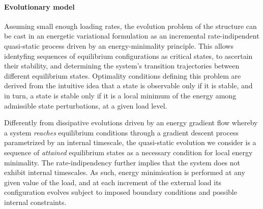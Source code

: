 \paragraph{Evolutionary model}

Assuming small enough loading rates,
the evolution problem of the structure can be cast in an energetic variational formulation as an incremental rate-indipendent quasi-static process driven by an energy-minimality principle.
This allows identyfing sequences of equilibrium configurations as critical states, to ascertain their stability, and determining the system's transition trajectories between different equilibrium states.
Optimality conditions defining this problem are derived from the
intuitive idea that a state is observable only if it is stable, and in turn, a state is stable only if it is a local minimum of the energy among admissible state perturbations, at a given load level.

Differently from dissipative evolutions driven by an energy gradient flow whereby a system \emph{reaches} equilibrium conditions through a gradient descent process parametrized by an internal timescale, the quasi-static evolution we consider is a sequence of \emph{attained} equilibrium states as a necessary condition for local energy minimality.
The rate-indipendency further implies that the system does not exhibit internal timescales.
As such, energy minimisation is performed at any given value of the load, and at each increment of the external load its configuration evolves subject to imposed boundary conditions and possible internal constraints.
% 

